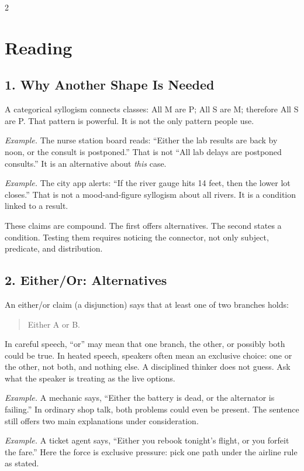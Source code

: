 \documentclass[12pt]{article}
\newcommand{\exbox}[1]{\par\vspace{0.2em}\noindent\textit{Example.} #1\par\vspace{0.15em}}
\begin{document}
\begin{multicols}{2}
\section*{Reading}

\subsection*{1. Why Another Shape Is Needed}
A categorical syllogism connects classes: All M are P; All S are M; therefore All S are P. That pattern is powerful. It is not the only pattern people use.

\exbox{The nurse station board reads: ``Either the lab results are back by noon, or the consult is postponed.'' That is not ``All lab delays are postponed consults.'' It is an alternative about \textit{this} case.}

\exbox{The city app alerts: ``If the river gauge hits 14 feet, then the lower lot closes.'' That is not a mood-and-figure syllogism about all rivers. It is a condition linked to a result.}

These claims are compound. The first offers alternatives. The second states a condition. Testing them requires noticing the connector, not only subject, predicate, and distribution.

\subsection*{2. Either/Or: Alternatives}
An either/or claim (a disjunction) says that at least one of two branches holds:
\begin{quote}
Either A or B.
\end{quote}

In careful speech, ``or'' may mean that one branch, the other, or possibly both could be true. In heated speech, speakers often mean an exclusive choice: one or the other, not both, and nothing else. A disciplined thinker does not guess. Ask what the speaker is treating as the live options.

\exbox{A mechanic says, ``Either the battery is dead, or the alternator is failing.'' In ordinary shop talk, both problems could even be present. The sentence still offers two main explanations under consideration.}

\exbox{A ticket agent says, ``Either you rebook tonight's flight, or you forfeit the fare.'' Here the force is exclusive pressure: pick one path under the airline rule as stated.}


\end{multicols}
\end{document}
